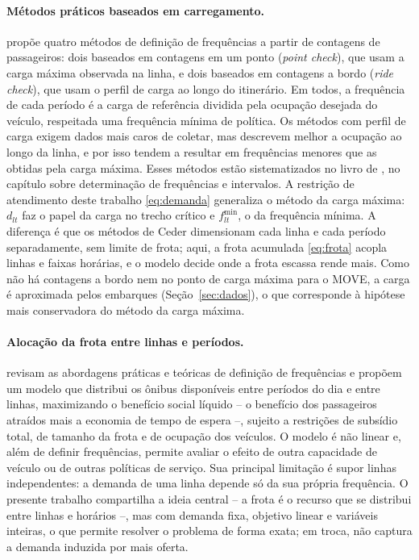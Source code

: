 \documentclass[11pt,a4paper]{article}
\begin{document}
\paragraph{Métodos práticos baseados em carregamento.}
\citet{ceder1984} propõe quatro métodos de definição de frequências a partir de
contagens de passageiros: dois baseados em contagens em um ponto
(\emph{point check}), que usam a carga máxima observada na linha, e dois
baseados em contagens a bordo (\emph{ride check}), que usam o perfil de carga ao
longo do itinerário. Em todos, a frequência de cada período é a carga de
referência dividida pela ocupação desejada do veículo, respeitada uma frequência
mínima de política. Os métodos com perfil de carga exigem dados mais caros de
coletar, mas descrevem melhor a ocupação ao longo da linha, e por isso tendem a
resultar em frequências menores que as obtidas pela carga máxima. Esses métodos estão
sistematizados no livro de \citet{ceder2016}, no capítulo sobre determinação de
frequências e intervalos. A restrição de atendimento deste trabalho
\eqref{eq:demanda} generaliza o método da carga máxima: $d_{lt}$ faz o papel
da carga no trecho crítico e $f^{\min}_{lt}$, o da frequência mínima. A
diferença é que os métodos de Ceder dimensionam cada linha e cada período
separadamente, sem limite de frota; aqui, a frota acumulada \eqref{eq:frota}
acopla linhas e faixas horárias, e o modelo decide onde a frota escassa rende
mais. Como não há contagens a bordo nem no ponto de carga máxima para o MOVE, a
carga é aproximada pelos embarques (Seção~\ref{sec:dados}), o que corresponde
à hipótese mais conservadora do método da carga máxima.

\paragraph{Alocação da frota entre linhas e períodos.}
\citet{furth1981} revisam as abordagens práticas e teóricas de definição de
frequências e propõem um modelo que distribui os ônibus disponíveis entre
períodos do dia e entre linhas, maximizando o benefício social líquido -- o
benefício dos passageiros atraídos mais a economia de tempo de espera --,
sujeito a restrições de subsídio total, de tamanho da frota e de ocupação dos
veículos. O modelo é não linear e, além de definir frequências, permite avaliar
o efeito de outra capacidade de veículo ou de outras políticas de serviço. Sua
principal limitação é supor linhas independentes: a demanda de uma linha
depende só da sua própria frequência. O presente trabalho compartilha a ideia
central -- a frota é o recurso que se distribui entre linhas e horários --, mas
com demanda fixa, objetivo linear e variáveis inteiras, o que permite resolver
o problema de forma exata; em troca, não captura a demanda induzida por mais
oferta.
\end{document}
